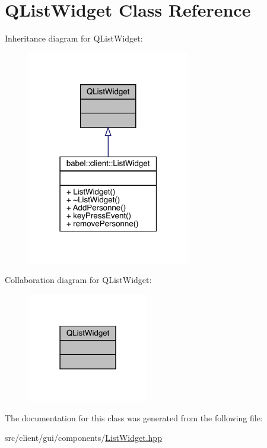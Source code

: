 \hypertarget{class_q_list_widget}{}\section{Q\+List\+Widget Class Reference}
\label{class_q_list_widget}


Inheritance diagram for Q\+List\+Widget\+:\nopagebreak
\begin{figure}[H]
\begin{center}
\leavevmode
\includegraphics[width=202pt]{class_q_list_widget__inherit__graph}
\end{center}
\end{figure}


Collaboration diagram for Q\+List\+Widget\+:\nopagebreak
\begin{figure}[H]
\begin{center}
\leavevmode
\includegraphics[width=150pt]{class_q_list_widget__coll__graph}
\end{center}
\end{figure}


The documentation for this class was generated from the following file\+:\begin{DoxyCompactItemize}
\item 
src/client/gui/components/\mbox{\hyperlink{_list_widget_8hpp}{List\+Widget.\+hpp}}\end{DoxyCompactItemize}
